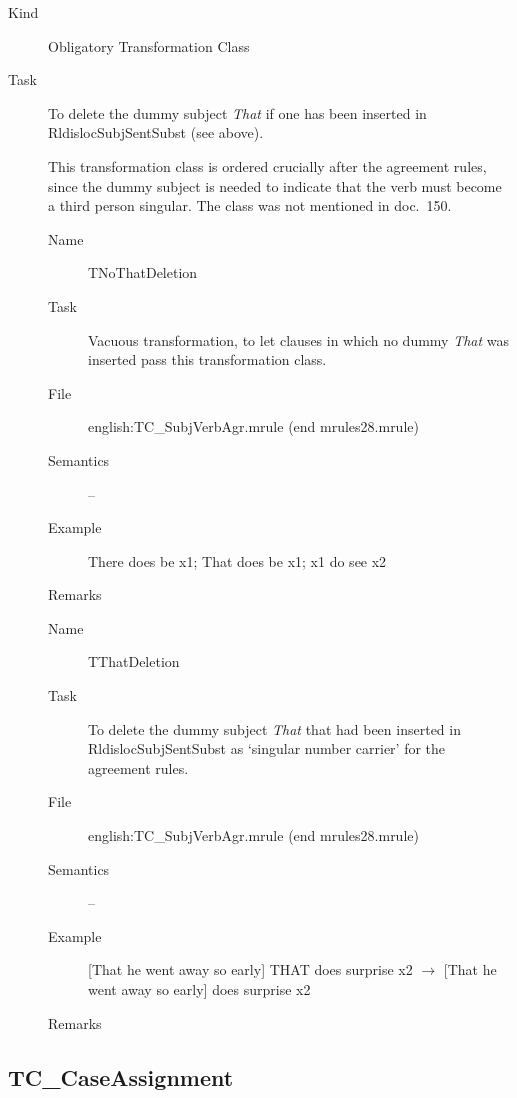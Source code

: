 \begin{description}
\item[Kind] Obligatory Transformation Class
\item[Task] To delete the dummy subject {\em That\/} if one has been inserted 
in Rldisloc\-Subj\-SentSubst (see above). 

This transformation class is ordered crucially after the agreement rules, since 
the dummy subject is needed to indicate that the verb must become a third 
person singular. The class was not mentioned in doc.\ 150.

\vspace{1 cm}
\begin{description}
\item[Name] TNoThatDeletion
\item[Task] Vacuous transformation, to let clauses in which no dummy 
{\em That\/} was inserted pass this transformation class.
\item[File] english:TC\_SubjVerbAgr.mrule (end mrules28.mrule)
\item[Semantics] --
\item[Example] There does be x1; That does be x1; x1 do see x2
\item[Remarks] 
\end{description}

\vspace{1 cm}
\begin{description}
\item[Name] TThatDeletion
\item[Task] To delete the dummy subject {\em That\/} that had been inserted 
in RldislocSubjSentSubst as `singular number carrier' for the agreement rules. 
\item[File] english:TC\_SubjVerbAgr.mrule (end mrules28.mrule)
\item[Semantics] --
\item[Example] [That he went away so early] THAT does surprise x2 $\rightarrow$ 
[That he went away so early] does surprise x2
\item[Remarks] 
\end{description}

\end{description}

\newpage
\subsection{TC\_CaseAssignment}

